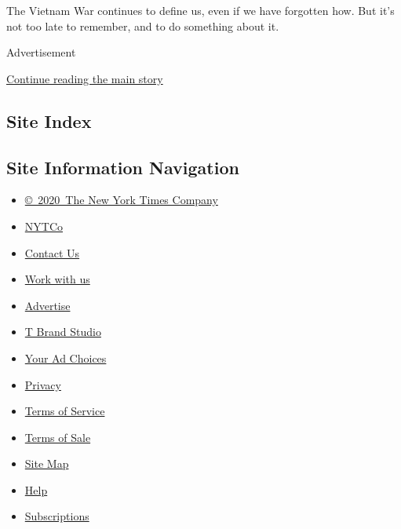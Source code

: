 The Vietnam War continues to define us, even if we have forgotten how.
But it's not too late to remember, and to do something about it.

Advertisement

\protect\hyperlink{after-bottom}{Continue reading the main story}

\hypertarget{site-index}{%
\subsection{Site Index}\label{site-index}}

\hypertarget{site-information-navigation}{%
\subsection{Site Information
Navigation}\label{site-information-navigation}}

\begin{itemize}
\tightlist
\item
  \href{https://help.nytimes3xbfgragh.onion/hc/en-us/articles/115014792127-Copyright-notice}{©~2020~The
  New York Times Company}
\end{itemize}

\begin{itemize}
\tightlist
\item
  \href{https://www.nytco.com/}{NYTCo}
\item
  \href{https://help.nytimes3xbfgragh.onion/hc/en-us/articles/115015385887-Contact-Us}{Contact
  Us}
\item
  \href{https://www.nytco.com/careers/}{Work with us}
\item
  \href{https://nytmediakit.com/}{Advertise}
\item
  \href{http://www.tbrandstudio.com/}{T Brand Studio}
\item
  \href{https://www.nytimes3xbfgragh.onion/privacy/cookie-policy\#how-do-i-manage-trackers}{Your
  Ad Choices}
\item
  \href{https://www.nytimes3xbfgragh.onion/privacy}{Privacy}
\item
  \href{https://help.nytimes3xbfgragh.onion/hc/en-us/articles/115014893428-Terms-of-service}{Terms
  of Service}
\item
  \href{https://help.nytimes3xbfgragh.onion/hc/en-us/articles/115014893968-Terms-of-sale}{Terms
  of Sale}
\item
  \href{https://spiderbites.nytimes3xbfgragh.onion}{Site Map}
\item
  \href{https://help.nytimes3xbfgragh.onion/hc/en-us}{Help}
\item
  \href{https://www.nytimes3xbfgragh.onion/subscription?campaignId=37WXW}{Subscriptions}
\end{itemize}
